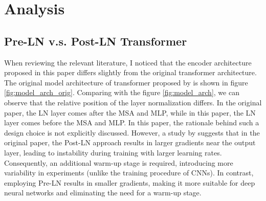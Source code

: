 \documentclass[12pt]{article}
\begin{document}





\section{Analysis}

\subsection{Pre-LN v.s. Post-LN Transformer}

When reviewing the relevant literature, I noticed that the encoder architecture proposed in this paper differs slightly from the original transformer architecture. The original model architecture of transformer proposed by \cite{vaswani_attention_2023} is shown in figure \ref{fig:model_arch_orig}. Comparing with the figure \ref{fig:model_arch}, we can observe that the relative position of the layer normalization differs. In the original paper, the LN layer comes after the MSA and MLP, while in this paper, the LN layer comes before the MSA and MLP. In this paper, the rationale behind such a design choice is not explicitly discussed. However, a study by \cite{xiong_layer_2020} suggests that in the original paper, the Post-LN approach results in larger gradients near the output layer, leading to instability during training with larger learning rates. Consequently, an additional warm-up stage is required, introducing more variability in experiments (unlike the training procedure of CNNs). In contrast, employing Pre-LN results in smaller gradients, making it more suitable for deep neural networks and eliminating the need for a warm-up stage.
\end{document}
